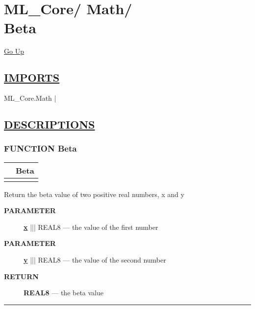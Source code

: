 \chapter*{\color{headfile}
{\large ML\_Core\slash\hspace{0pt}}
{\large Math\slash\hspace{0pt}}
 \\
Beta
}
\hypertarget{ecldoc:toc:ML_Core.Math.Beta}{}
\hyperlink{ecldoc:toc:root/ML_Core/Math}{Go Up}

\section*{\underline{\textsf{IMPORTS}}}
\begin{doublespace}
{\large
ML\_Core.Math |
}
\end{doublespace}

\section*{\underline{\textsf{DESCRIPTIONS}}}
\subsection*{\textsf{\colorbox{headtoc}{\color{white} FUNCTION}
Beta}}

\hypertarget{ecldoc:ml_core.math.beta}{}

{\renewcommand{\arraystretch}{1.5}
\begin{tabularx}{\textwidth}{|>{\raggedright\arraybackslash}l|X|}
\hline
\hspace{0pt}\mytexttt{\color{red} } & \textbf{Beta} \\
\hline
\multicolumn{2}{|>{\raggedright\arraybackslash}X|}{\hspace{0pt}\mytexttt{\color{param} (REAL8 x, REAL8 y)}} \\
\hline
\end{tabularx}
}

\par





Return the beta value of two positive real numbers, x and y






\par
\begin{description}
\item [\colorbox{tagtype}{\color{white} \textbf{\textsf{PARAMETER}}}] \textbf{\underline{x}} ||| REAL8 --- the value of the first number
\item [\colorbox{tagtype}{\color{white} \textbf{\textsf{PARAMETER}}}] \textbf{\underline{y}} ||| REAL8 --- the value of the second number
\end{description}







\par
\begin{description}
\item [\colorbox{tagtype}{\color{white} \textbf{\textsf{RETURN}}}] \textbf{REAL8} --- the beta value
\end{description}




\rule{\linewidth}{0.5pt}
